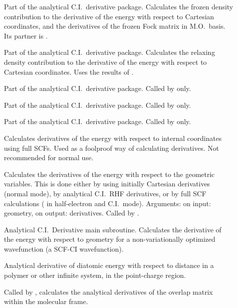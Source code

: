 \begin{description}
\item[] Part of the analytical C.I.\ derivative package. 
Calculates the frozen density contribution to the derivative of  the energy
with respect to Cartesian coordinates, and the derivatives of  the frozen Fock
matrix in M.O.\ basis. Its partner is .

\item[] Part of the analytical C.I.\ derivative package. 
Calculates the relaxing density contribution to the derivative of the energy
with respect to Cartesian coordinates. Uses the results of .

\item[] Part of the analytical C.I.\ derivative package.  Called
by  only.

\item[] Part of the analytical C.I.\ derivative package.  Called
by  only.

\item[] Part of the analytical C.I.\ derivative package.  Called
by  only.

\item[] Calculates derivatives of the energy with respect to
internal coordinates using full SCFs.  Used as a foolproof way of calculating
derivatives.  Not recommended for normal use.

\item[] Calculates the derivatives of the energy with respect
to the geometric variables.  This is done either by  using initially Cartesian
derivatives (normal mode), by  analytical C.I.\ RHF derivatives, or by full SCF
calculations  ( in half-electron and C.I.\ mode). Arguments: on 
input: geometry, on output: derivatives. Called by .

\item[] Analytical C.I.\ Derivative main subroutine. 
Calculates the derivative of the energy with respect to geometry for a
non-variationally optimized wavefunction (a SCF-CI wavefunction).

\item[] Analytical derivative of diatomic energy with respect to
distance in a polymer or other infinite system, in the point-charge region.

\item[] Called by ,  calculates the
analytical derivatives of the overlap matrix within the molecular frame.


\end{description}
